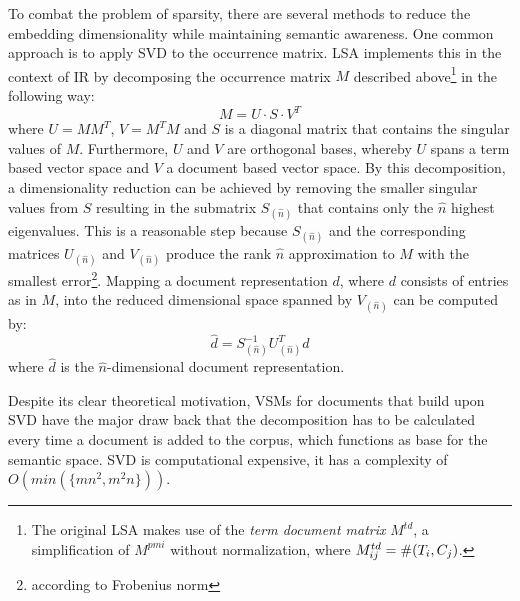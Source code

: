 To combat the problem of sparsity, there are several methods to reduce the embedding dimensionality while maintaining semantic awareness. One common approach is to apply \ac{SVD} \autocite{beltrami_sulle_1873} to the occurrence matrix. \ac{LSA} \autocite{deerwester_indexing_1990} implements this in the context of \ac{IR} by decomposing the occurrence matrix $M$ described above\footnote{The original \ac{LSA} makes use of the \textit{term document matrix} $M^{td}$, a simplification of $M^{pmi}$ without normalization, where $M^{td}_{ij} =\nobreak \#(T_i, C_j)$.} in the following way:
\begin{equation}
M = U \cdot S \cdot V^T
\end{equation}
where $U = MM^T$, $V = M^TM$ and $S$ is a diagonal matrix that contains the singular values of $M$. Furthermore, $U$ and $V$ are orthogonal bases, whereby $U$ spans a term based vector space and $V$ a document based vector space. By this decomposition, a dimensionality reduction can be achieved by removing the smaller singular values from $S$ resulting in the submatrix $S_{(\hat{n})}$ that contains only the $\hat{n}$ highest eigenvalues. This is a reasonable step because $S_{(\hat{n})}$ and the corresponding matrices $U_{(\hat{n})}$ and $V_{(\hat{n})}$ produce the rank $\hat{n}$ approximation to $M$ with the smallest error\footnote{according to Frobenius norm}\autocite{hofmann_unsupervised_2001}. Mapping a document representation $d$, where $d$ consists of entries as in $M$, into the reduced dimensional space spanned by $V_{(\hat{n})}$ can be computed by: 
\begin{equation} \label{eq:svd_doc}
\hat{d} = S_{(\hat{n})}^{-1}U_{(\hat{n})}^Td
\end{equation}
where $\hat{d}$ is the $\hat{n}$-dimensional document representation. 

Despite its clear theoretical motivation, \acp{VSM} for documents that build upon \ac{SVD} have the major draw back that the decomposition has to be calculated every time a document is added to the corpus, which functions as base for the semantic space. \ac{SVD} is computational expensive, it has a complexity of $O(min(\{mn^2,m^2n\}))$. %

